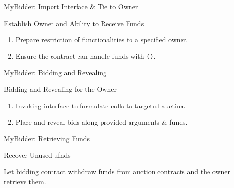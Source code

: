 \documentclass[]{beamer}
\begin{document}
\begin{frame}{MyBidder: Import Interface \& Tie to Owner}

\begin{samplecode}{Establish Owner and Ability to Receive Funds}
	
\end{samplecode}
\begin{enumerate}
	\item	Prepare restriction of functionalities to a specified owner.
	\item	Ensure the contract can handle funds with \texttt{()}.
\end{enumerate}

\end{frame}

\begin{frame}{MyBidder: Bidding and Revealing}

\begin{samplecode}{Bidding and Revealing for the Owner}
	
\end{samplecode}
\begin{enumerate}
	\item	Invoking interface to formulate calls to targeted auction.
	\item	Place and reveal bids along provided arguments \& funds.
\end{enumerate}

\end{frame}

\begin{frame}{MyBidder: Retrieving Funds}

\begin{samplecode}{Recover Unused ufnds}
	
\end{samplecode}

\vspace{1em}
Let bidding contract withdraw funds from auction contracts and the owner retrieve them.

\end{frame}
\end{document}
